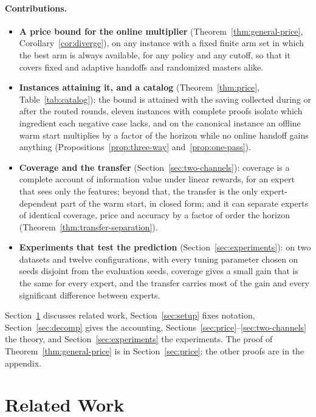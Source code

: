 \documentclass{article}
\theoremstyle{definition}
\theoremstyle{remark}
\theoremstyle{remark}
\begin{document}
\paragraph{Contributions.}
\begin{itemize}[itemsep=1pt, topsep=1pt, leftmargin=*]
\item \textbf{A price bound for the online multiplier}
(Theorem~\ref{thm:general-price}, Corollary~\ref{cor:diverge}), on any
instance with a fixed finite arm set in which the best arm is always
available, for any policy and any cutoff, so that it covers fixed and
adaptive handoffs and randomized masters alike.
\item \textbf{Instances attaining it, and a catalog}
(Theorem~\ref{thm:price}, Table~\ref{tab:catalog}): the bound is attained
with the saving collected during or after the routed rounds, eleven instances
with complete proofs isolate which ingredient each negative case lacks, and
on the canonical instance an offline warm start multiplies by a factor of the
horizon while no online handoff gains anything
(Propositions~\ref{prop:three-way} and~\ref{prop:one-pass}).
\item \textbf{Coverage and the transfer} (Section~\ref{sec:two-channels}):
coverage is a complete account of information value under linear rewards,
for an expert that sees only the features; beyond that, the transfer is the
only expert-dependent part of the warm start, in closed form; and it can
separate experts of identical coverage, price and accuracy by a factor of
order the horizon (Theorem~\ref{thm:transfer-separation}).
\item \textbf{Experiments that test the prediction}
(Section~\ref{sec:experiments}): on two datasets and twelve configurations,
with every tuning parameter chosen on seeds disjoint from the evaluation
seeds, coverage gives a small gain that is the same for every expert, and the
transfer carries most of the gain and every significant difference between
experts.
\end{itemize}
Section~\ref{sec:related-main} discusses related work,
Section~\ref{sec:setup} fixes notation, Section~\ref{sec:decomp} gives the
accounting, Sections~\ref{sec:price}--\ref{sec:two-channels} the theory, and
Section~\ref{sec:experiments} the experiments. The proof of
Theorem~\ref{thm:general-price} is in Section~\ref{sec:price}; the other proofs
are in the appendix.

\section{Related Work}
\label{sec:related-main}
\end{document}
